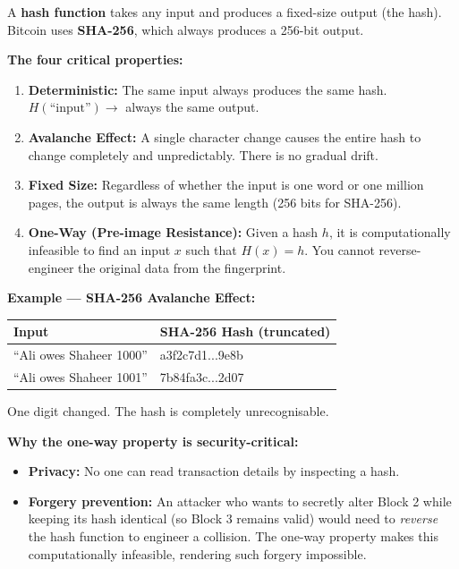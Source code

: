 \documentclass[12pt, a4paper]{article}
\begin{document}
A \textbf{hash function} takes any input and produces a fixed-size output (the hash).
Bitcoin uses \textbf{SHA-256}, which always produces a 256-bit output.

\textbf{The four critical properties:}

\begin{enumerate}
    \item \textbf{Deterministic:} The same input always produces the same hash.
          $H(\text{``input''}) \to$ always the same output.

    \item \textbf{Avalanche Effect:} A single character change causes the entire
          hash to change completely and unpredictably. There is no gradual drift.

    \item \textbf{Fixed Size:} Regardless of whether the input is one word or
          one million pages, the output is always the same length (256 bits for SHA-256).

    \item \textbf{One-Way (Pre-image Resistance):} Given a hash $h$, it is
          computationally infeasible to find an input $x$ such that $H(x) = h$.
          You cannot reverse-engineer the original data from the fingerprint.
\end{enumerate}

\textbf{Example --- SHA-256 Avalanche Effect:}
\begin{center}
\begin{tabular}{l >{\ttfamily\small}l}
\toprule
\textbf{Input} & \textbf{SHA-256 Hash (truncated)} \\
\midrule
``Ali owes Shaheer 1000'' & a3f2c7d1...9e8b \\
``Ali owes Shaheer 1001'' & 7b84fa3c...2d07 \\
\bottomrule
\end{tabular}
\end{center}
One digit changed. The hash is completely unrecognisable.

\textbf{Why the one-way property is security-critical:}
\begin{itemize}
    \item \textbf{Privacy:} No one can read transaction details by inspecting a hash.
    \item \textbf{Forgery prevention:} An attacker who wants to secretly alter Block 2
          while keeping its hash identical (so Block 3 remains valid) would need to
          \emph{reverse} the hash function to engineer a collision. The one-way property
          makes this computationally infeasible, rendering such forgery impossible.
\end{itemize}
\end{document}
